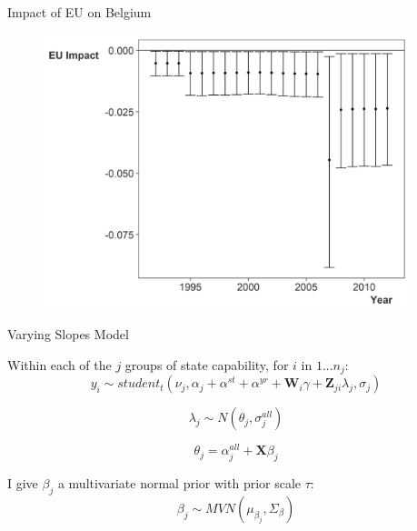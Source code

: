 \documentclass[12pt]{beamer}
\begin{document}

\begin{frame}{Impact of EU on Belgium}


\begin{figure}
	\centering
		\includegraphics[width=0.95\textwidth]{bel-eu-imp.png}
\end{figure}


\end{frame}





\begin{frame}{Varying Slopes Model}

Within each of the $j$ groups of state capability, for $i$ in $1 ... n_j$: 
\begin{equation*}
y_i \sim student_t(\nu_j, \alpha_j + \alpha^{st} + \alpha^{yr} +\textbf{W}_{i} \gamma  + \textbf{Z}_{ji} \lambda_{j}, \sigma_j) 
\end{equation*} 

\begin{equation*}
\lambda_{j} \sim N(\theta_{j}, \sigma^{all}_{j})
\end{equation*} 

\begin{equation*}
\theta_{j} = \alpha^{all}_{j} + \textbf{X} \beta_j
\end{equation*}

I give $\beta_j$ a multivariate normal prior with prior scale $\tau$:
\begin{equation*}
\beta_j \sim MVN(\mu_{\beta_j}, \Sigma_{\beta}) 
\end{equation*}

\end{frame}
\end{document}
